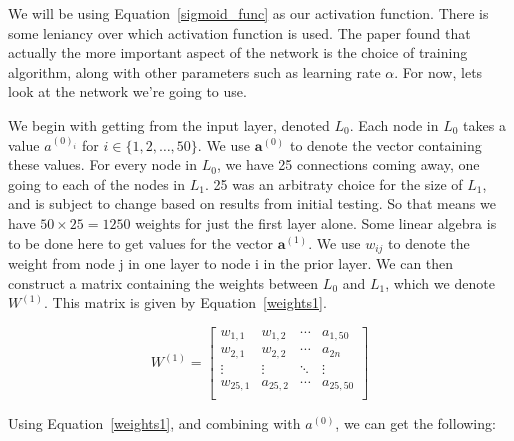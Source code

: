 We will be using Equation~\ref{sigmoid_func} as our activation function. There is some leniancy over which activation function is used. The paper \cite{sibi} found that actually the more important aspect of 
the network is the choice of training algorithm, along with other parameters such as learning rate $\alpha$. For now, lets look at the network we're going to use. 

We begin with getting from the input layer, denoted $L_0$. Each node in $L_0$ takes a value $a^{(0)_i}$ for $i \in \{1,2,\ldots,50\}$. We use $\textbf{a}^{(0)}$ to denote the vector
containing these values. For every node in $L_0$, we have 25 connections coming away, one going to each of the nodes in $L_1$. 25 was an arbitraty choice for the size of $L_1$, and is
subject to change based on results from initial testing. So that means we have $50 \times 25 = 1250$ weights for just the first layer alone. Some linear algebra is to be done here to get 
values for the vector $\textbf{a}^{(1)}$. We use $w_{ij}$ to denote the weight from node j in one layer to node i in the prior layer. We can then construct a matrix containing the weights
between $L_0$ and $L_1$, which we denote $W^{(1)}$. This matrix is given by Equation~\ref{weights1}.

\begin{equation}
    W^{(1)} =
    \left[ {\begin{array}{cccc}
      w_{1,1} & w_{1,2} & \cdots & a_{1,50}\\
      w_{2,1} & w_{2,2} & \cdots & a_{2n}\\
      \vdots & \vdots & \ddots & \vdots\\
      w_{25,1} & a_{25,2} & \cdots & a_{25,50}\\
    \end{array} } \right]
    \label{weights1}
\end{equation}

Using Equation~\ref{weights1}, and combining with $a^{(0)}$, we can get the following:

